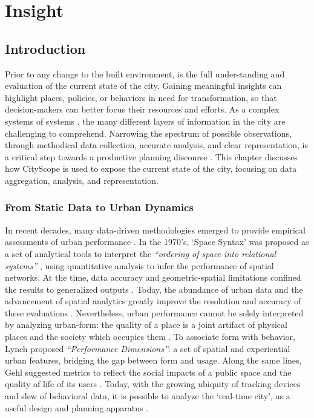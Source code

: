 

\chapter{Insight\label{ch:insight}}

\section{Introduction}
 {

  Prior to any change to the built environment, is the full understanding and evaluation of the current state of the city. Gaining meaningful insights can highlight places, policies, or behaviors in need for transformation, so that decision-makers can better focus their resources and efforts. As a complex systems of systems \cite{Batty2009}, the many different layers of information in the city are challenging to comprehend. Narrowing the spectrum of possible observations, through methodical data collection, accurate analysis, and clear representation, is a critical step towards a productive planning discourse \cite{banerjee2011companion}. This chapter discusses how CityScope is used to expose the current state of the city, focusing on data aggregation, analysis, and representation.


  \subsection{From Static Data to Urban Dynamics}

  {
      In recent decades, many data-driven methodologies emerged to provide empirical assessments of urban performance \cite{Inostroza2015, hillier1987ideas}. In the 1970's, `Space Syntax' was proposed as a set of analytical tools to interpret the \textit{``ordering of space into relational systems''} \cite{Hillier1993}, using quantitative analysis to infer the performance of spatial networks. At the time, data accuracy and geometric-spatial limitations confined the results to generalized outputs \cite{herold2005role}. Today, the abundance of urban data and the advancement of spatial analytics greatly improve the resolution and accuracy of these evaluations \cite{Batty2000}. Nevertheless, urban performance cannot be solely interpreted by analyzing urban-form: the quality of a place is a joint artifact of physical places and the society which occupies them \cite{lynch1984good}. To associate form with behavior, Lynch proposed \textit{``Performance Dimensions''}: a set of spatial and experiential urban features, bridging the gap between form and usage. Along the same lines, Gehl suggested metrics to reflect the social impacts of a public space and the quality of life of its users \cite{gehl2013study}. Today, with the growing ubiquity of tracking devices and slew of behavioral data, it is possible to analyze the `real-time city', as a useful design and planning apparatus \cite{ Ratti2006, Kitchin2014, Batty2013}.
  }

}
